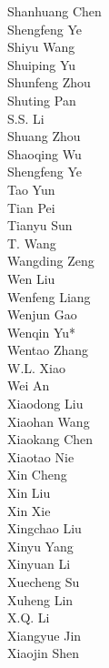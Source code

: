 \documentclass[11pt, a4paper, logo, copyright, nonumbering]{deepseek}
\begin{document}
{\begin{multicols}{2}
\color{damaiblue} Shanhuang Chen \\
\color{damaiblue} Shengfeng Ye \\
\color{damaiblue} Shiyu Wang \\
\color{damaiblue} Shuiping Yu \\
\color{damaiblue} Shunfeng Zhou \\
\color{damaiblue} Shuting Pan \\
\color{damaiblue} S.S. Li \\
\color{damaiblue} Shuang Zhou \\
\color{damaiblue} Shaoqing Wu \\
\color{damaiblue} Shengfeng Ye \\
\color{damaiblue} Tao Yun \\
\color{damaiblue} Tian Pei \\
\color{damaiblue} Tianyu Sun \\
\color{damaiblue} T. Wang \\
\color{damaiblue} Wangding Zeng \\
\color{damaiblue} Wen Liu \\
\color{damaiblue} Wenfeng Liang \\
\color{damaiblue} Wenjun Gao \\
\color{damaiblue} Wenqin Yu* \\
\color{damaiblue} Wentao Zhang \\
\color{damaiblue} W.L. Xiao \\
\color{damaiblue} Wei An \\
\color{damaiblue} Xiaodong Liu \\
\color{damaiblue} Xiaohan Wang \\
\color{damaiblue} Xiaokang Chen \\
\color{damaiblue} Xiaotao Nie \\
\color{damaiblue} Xin Cheng \\
\color{damaiblue} Xin Liu \\
\color{damaiblue} Xin Xie \\
\color{damaiblue} Xingchao Liu \\
\color{damaiblue} Xinyu Yang \\
\color{damaiblue} Xinyuan Li \\
\color{damaiblue} Xuecheng Su \\
\color{damaiblue} Xuheng Lin \\
\color{damaiblue} X.Q. Li \\
\color{damaiblue} Xiangyue Jin \\
\color{damaiblue} Xiaojin Shen \\

\end{multicols}}
\end{document}
